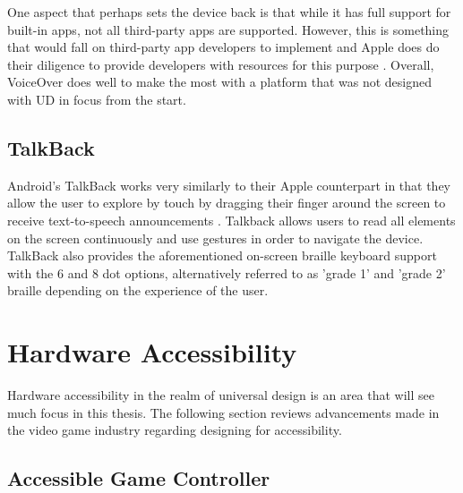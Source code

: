 One aspect that perhaps sets the device back is that while it has full support for built-in apps, not all third-party apps are supported.
However, this is something that would fall on third-party app developers to implement and Apple does do their diligence to provide developers with resources for this purpose \cite{iphonedev}.
Overall, VoiceOver does well to make the most with a platform that was not designed with UD in focus from the start.


\subsection{TalkBack}

Android's TalkBack works very similarly to their Apple counterpart in that they allow the user to explore by touch by dragging their finger around the screen to receive text-to-speech announcements \cite{android}.
Talkback allows users to read all elements on the screen continuously and use gestures in order to navigate the device. %
TalkBack also provides the aforementioned on-screen braille keyboard support with the 6 and 8 dot options, alternatively referred to as 'grade 1' and 'grade 2' braille depending on the experience of the user.


\section{Hardware Accessibility}

Hardware accessibility in the realm of universal design is an area that will see much focus in this thesis. %
The following section reviews advancements made in the video game industry regarding designing for accessibility.


\subsection{Accessible Game Controller}

